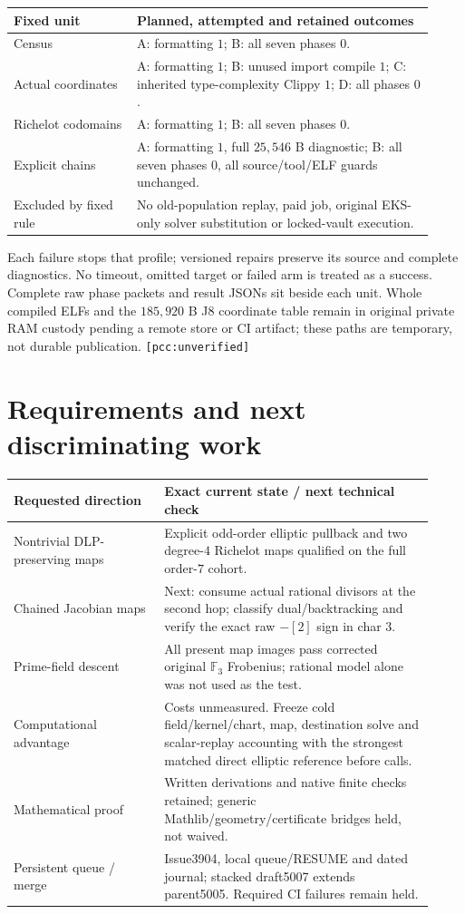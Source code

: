 \documentclass[10pt,a4paper]{article}
\newcommand{\uv}{\texttt{[pcc:unverified]}}
\begin{document}
\begin{center}\begin{tabular}{@{}L{0.27\linewidth}L{0.65\linewidth}@{}}
\toprule
Fixed unit & Planned, attempted and retained outcomes\\\midrule
Census & A: formatting $1$; B: all seven phases $0$.\\
Actual coordinates & A: formatting $1$; B: unused import compile $1$;
C: inherited type-complexity Clippy $1$; D: all phases $0$.\\
Richelot codomains & A: formatting $1$; B: all seven phases $0$.\\
Explicit chains & A: formatting $1$, full $25{,}546$ B diagnostic;
B: all seven phases $0$, all source/tool/ELF guards unchanged.\\
Excluded by fixed rule & No old-population replay, paid job, original EKS-only
solver substitution or locked-vault execution.\\
\bottomrule\end{tabular}\end{center}
Each failure stops that profile; versioned repairs preserve its source and
complete diagnostics. No timeout, omitted target or failed arm is treated
as a success. Complete raw phase packets and result JSONs sit beside each
unit. Whole compiled ELFs and the $185{,}920$ B J8 coordinate table remain
in original private RAM custody pending a remote store or CI artifact;
these paths are temporary, not durable publication. \uv

\section{Requirements and next discriminating work}
\begin{center}\begin{tabular}{@{}L{0.33\linewidth}L{0.59\linewidth}@{}}
\toprule
Requested direction & Exact current state / next technical check\\\midrule
Nontrivial DLP-preserving maps & Explicit odd-order elliptic pullback and two
degree-$4$ Richelot maps qualified on the full order-$7$ cohort.\\
Chained Jacobian maps & Next: consume actual rational divisors at the second
hop; classify dual/backtracking and verify the exact raw $-[2]$ sign in char $3$.\\
Prime-field descent & All present map images pass corrected original
$\mathbb F_3$ Frobenius; rational model alone was not used as the test.\\
Computational advantage & Costs unmeasured. Freeze cold field/kernel/chart,
map, destination solve and scalar-replay accounting with the strongest
matched direct elliptic reference before calls.\\
Mathematical proof & Written derivations and native finite checks retained;
generic Mathlib/geometry/certificate bridges held, not waived.\\
Persistent queue / merge & Issue3904, local queue/RESUME and dated journal;
stacked draft5007 extends parent5005. Required CI failures remain held.\\
\bottomrule\end{tabular}\end{center}
\end{document}
